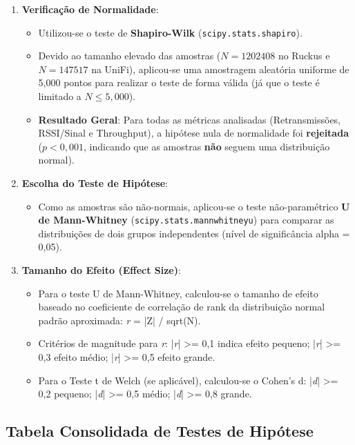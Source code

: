 \begin{enumerate}
  \item \textbf{Verificação de Normalidade}:
  \begin{itemize}
    \item Utilizou-se o teste de \textbf{Shapiro-Wilk} (\texttt{scipy.stats.shapiro}).
    \item Devido ao tamanho elevado das amostras ($N = 1202408$ no Ruckus e $N = 147517$ na UniFi), aplicou-se uma amostragem aleatória uniforme de 5,000 pontos para realizar o teste de forma válida (já que o teste é limitado a $N \le 5,000$).
    \item \textbf{Resultado Geral}: Para todas as métricas analisadas (Retransmissões, RSSI/Sinal e Throughput), a hipótese nula de normalidade foi \textbf{rejeitada} ($p < 0,001$, indicando que as amostras \textbf{não} seguem uma distribuição normal).
\end{itemize}
  \item \textbf{Escolha do Teste de Hipótese}:
  \begin{itemize}
    \item Como as amostras são não-normais, aplicou-se o teste não-paramétrico \textbf{U de Mann-Whitney} (\texttt{scipy.stats.mannwhitneyu}) para comparar as distribuições de dois grupos independentes (nível de significância alpha = 0,05).
\end{itemize}
  \item \textbf{Tamanho do Efeito (Effect Size)}:
  \begin{itemize}
    \item Para o teste U de Mann-Whitney, calculou-se o tamanho de efeito baseado no coeficiente de correlação de rank da distribuição normal padrão aproximada: \textit{r} = |Z| / sqrt(N).
    \item Critérios de magnitude para \textit{r}: |\textit{r}| >= 0,1 indica efeito pequeno; |\textit{r}| >= 0,3 efeito médio; |\textit{r}| >= 0,5 efeito grande.
    \item Para o Teste t de Welch (se aplicável), calculou-se o Cohen's d: |\textit{d}| >= 0,2 pequeno; |\textit{d}| >= 0,5 médio; |\textit{d}| >= 0,8 grande.


\end{itemize}
\end{enumerate}
\subsection{Tabela Consolidada de Testes de Hipótese}

